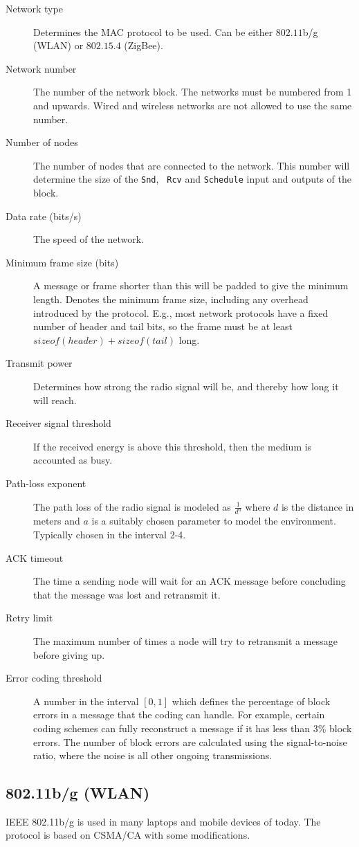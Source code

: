 \documentclass[final,twoside]{rapport}
\begin{document}
\begin{description}
\item[Network type] Determines the MAC protocol to be used. Can
  be either $802.11$b/g (WLAN) or $802.15.4$ (ZigBee).
\item[Network number] The number of the network block. The networks
  must be numbered from 1 and upwards. Wired and wireless networks are
  not allowed to use the same number.
\item[Number of nodes] The number of nodes that are connected to the
  network. This number will determine the size of the {\tt Snd}, {\tt
    Rcv} and {\tt Schedule} input and outputs of the block.
\item[Data rate (bits/s)] The speed of the network.
\item[Minimum frame size (bits)] A message or frame shorter than this
  will be padded to give the minimum length. Denotes the minimum frame
  size, including any overhead introduced by the protocol. E.g., most
  network protocols have a fixed number of header and tail bits, so
  the frame must be at least $sizeof(header)+sizeof(tail)$ long.
\item[Transmit power] Determines how strong the radio signal will be,
  and thereby how long it will reach.
\item[Receiver signal threshold] If the received energy is above this
  threshold, then the medium is accounted as busy.
\item[Path-loss exponent] The path loss of the radio signal is modeled
  as $\frac{1}{d^a}$ where $d$ is the distance in meters and $a$ is a
  suitably chosen parameter to model the environment. Typically chosen
  in the interval 2-4.
\item[ACK timeout] The time a sending node will wait for an ACK
  message before concluding that the message was lost and retransmit
  it.
\item[Retry limit] The maximum number of times a node will try to
  retransmit a message before giving up.
\item[Error coding threshold] A number in the interval $[0,1]$ which
  defines the percentage of block errors in a message that the coding
  can handle. For example, certain coding schemes can fully
  reconstruct a message if it has less than $3$\% block errors. The
  number of block errors are calculated using the signal-to-noise ratio,
  where the noise is all other ongoing transmissions.
\end{description}

\subsection{802.11b/g (WLAN)}
IEEE 802.11b/g is used in many laptops and mobile devices of today.
The protocol is based on CSMA/CA with some modifications. 
\end{document}

